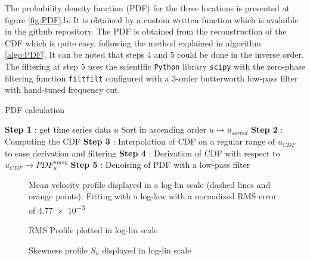 \documentclass[12pt]{article}
\begin{document}
The probability density function (PDF) for the three locations is presented at figure \ref{fig:PDF}.b. It is obtained by a custom written function which is avalaible in the github repository. The PDF is obtained from the reconstruction of the CDF which is quite easy, following the method explained in algorithm \ref{algo:PDF}. It can be noted that steps 4 and 5 could be done in the inverse order. The filtering at step 5 uses the scientific \verb|Python| library \verb|scipy| with the zero-phase filtering function \verb|filtfilt| configured with a 3-order butterworth low-pass filter with hand-tuned frequency cut.\\

\begin{algorithm}
\label{algo:PDF}
\caption{PDF calculation}
\SetAlgoLined
{}
\textbf{Step 1} : get time series data $u$\;
Sort in ascending order $u \rightarrow u_{sorted}$\;
\textbf{Step 2} : Computing the CDF\;
\textbf{Step 3} : Interpolation of CDF on a regular range of $u_{CDF}$ to ease derivation and filtering\;
\textbf{Step 4} : Derivation of CDF with respect to $u_{CDF} \rightarrow  PDF_u^{noisy}$\;
\textbf{Step 5} : Denoising of PDF with a low-pass filter\;
\end{algorithm}


\begin{figure}
    \centering
        \resizebox{0.6\linewidth}{!}{}
    \caption{Mean velocity profile displayed in a log-lin scale (dashed lines and orange points). Fitting with a log-law with a normalized RMS error of \num{4.77e-3}}
    \label{fig:Mean_Velocity_Profile}
\end{figure}

\begin{figure}
    \centering
        \resizebox{0.6\linewidth}{!}{}
    \caption{RMS Profile plotted in log-lin scale}
    \label{fig:RMS_Profile}
\end{figure}

\begin{figure}
    \centering
        \resizebox{0.6\linewidth}{!}{}
    \caption{Skewness profile $S_u$ displayed in log-lin scale}
    \label{fig:Skewness_Profile}
\end{figure}
\end{document}
